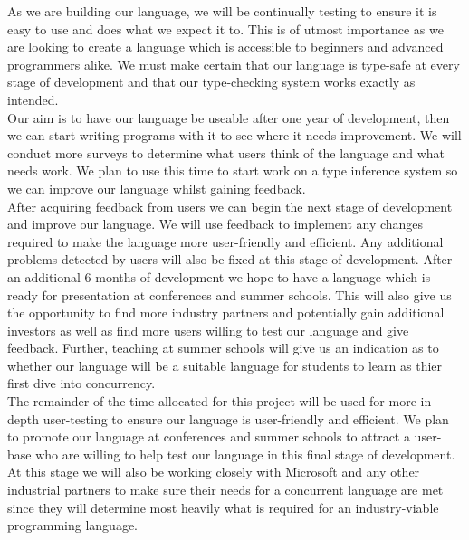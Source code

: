 \documentclass[11pt]{article}
\begin{document}
    \noindent
    As we are building our language, we will be continually testing to ensure it is easy to use and does 
    what we expect it to. This is of utmost importance as we are looking to create a language which is 
    accessible to beginners and advanced programmers alike. We must make certain that our language is 
    type-safe at every stage of development and that our type-checking system works exactly as intended. \\

    \noindent
    Our aim is to have our language be useable after one year of development, then we can start writing 
    programs with it to see where it needs improvement. We will conduct more surveys to determine what 
    users think of the language and what needs work. We plan to use this time to start work on a type 
    inference system so we can improve our language whilst gaining feedback. \\

    \noindent
    After acquiring feedback from users we can begin the next stage of development and improve our 
    language. We will use feedback to implement any changes required to make the language more 
    user-friendly and efficient. Any additional problems detected by users will also be fixed at 
    this stage of development. After an additional 6 months of development we hope to have a 
    language which is ready for presentation at conferences and summer schools. This will also give 
    us the opportunity to find more industry partners and potentially gain additional investors as 
    well as find more users willing to test our language and give feedback. 
    Further, teaching at summer schools will give us an indication as to whether our language will 
    be a suitable language for students to learn as thier first dive into concurrency. \\

    \noindent
    The remainder of the time allocated for this project will be used for more in depth user-testing 
    to ensure our language is user-friendly and efficient. We plan to promote our language at conferences 
    and summer schools to attract a user-base who are willing to help test our language in this final 
    stage of development. At this stage we will also be working closely with Microsoft and any other 
    industrial partners to make sure their needs for a concurrent language are met since they will determine 
    most heavily what is required for an industry-viable programming language. \\
    
    \printbibliography
\end{document}
